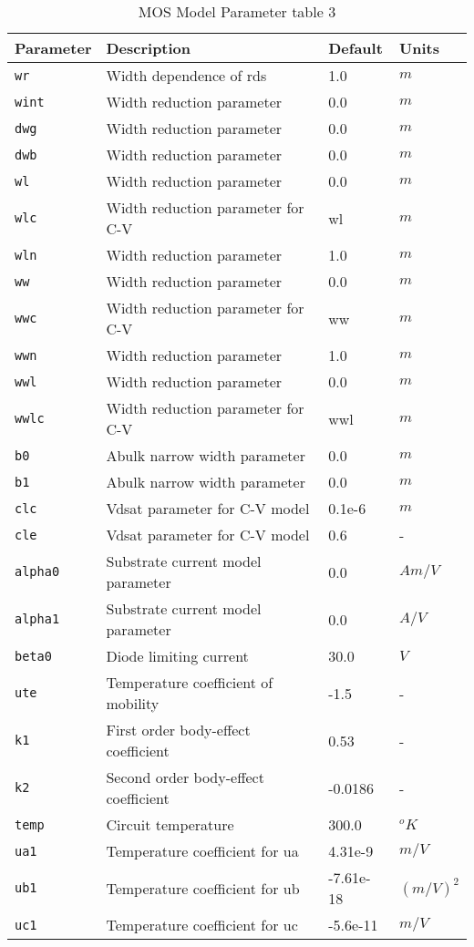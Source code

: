 \documentclass{article}
\begin{document}
\newpage
\begin{table}[H]
\begin{tabular}{|l| l| l| l|}
\hline
\textbf{Parameter} & \textbf{Description} & \textbf{Default} & \textbf{Units} \\
\hline
\texttt{wr} & Width dependence of rds & 1.0 & $m$\\
\texttt{wint} & Width reduction parameter & 0.0 & $m$\\
\texttt{dwg} & Width reduction parameter & 0.0 & $m$\\
\texttt{dwb} & Width reduction parameter & 0.0 & $m$\\
\texttt{wl} & Width reduction parameter & 0.0 & $m$\\
\texttt{wlc} & Width reduction parameter for C-V & wl & $m$\\
\texttt{wln} & Width reduction parameter & 1.0 & $m$\\
\texttt{ww} & Width reduction parameter & 0.0 & $m$\\
\texttt{wwc} & Width reduction parameter for C-V & ww & $m$\\
\texttt{wwn} & Width reduction parameter & 1.0 & $m$\\
\texttt{wwl} & Width reduction parameter & 0.0 & $m$\\
\texttt{wwlc} & Width reduction parameter for C-V & wwl & $m$\\
\texttt{b0} & Abulk narrow width parameter & 0.0 & $m$\\
\texttt{b1} & Abulk narrow width parameter & 0.0 & $m$\\
\texttt{clc} & Vdsat parameter for C-V model & 0.1e-6 & $m$\\
\texttt{cle} & Vdsat parameter for C-V model & 0.6 & -\\
\texttt{alpha0} & Substrate current model parameter & 0.0 & $Am/V$\\
\texttt{alpha1} & Substrate current model parameter & 0.0 & $A/V$\\
\texttt{beta0} & Diode limiting current & 30.0 & $V$\\
\texttt{ute} & Temperature coefficient of mobility & -1.5 & -\\
\texttt{k1} & First order body-effect coefficient & 0.53 & -\\
\texttt{k2} & Second order body-effect coefficient & -0.0186 & -\\
\texttt{temp} & Circuit temperature & 300.0 & $^oK$\\
\texttt{ua1} & Temperature coefficient for ua & 4.31e-9 & $m/V$\\
\texttt{ub1} & Temperature coefficient for ub & -7.61e-18 & $(m/V)^2$\\
\texttt{uc1} & Temperature coefficient for uc & -5.6e-11 & $m/V$\\
\hline
\end{tabular}
\caption{\label{bsim3.params3} MOS Model Parameter table 3}
\end{table}
\end{document}
